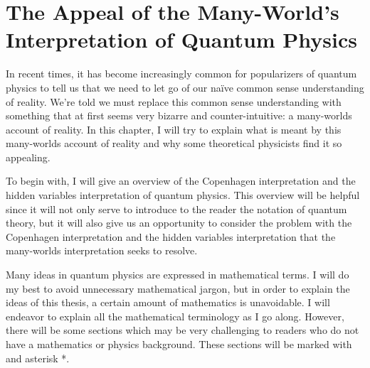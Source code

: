 \begin{comment}
    \section{Introduction}
    \emph{}
    
    Common sense is very often underrated. This is especially so in the light of modern physics. Not infrequently, one hears people claim that modern physics shows us that reality is fundamentally weird and that we must discard our naïve common sense intuitions. Now perhaps these people are right, but if we are to accept their claims, they ought to have really compelling reasons. The usual response to an argument that results in weird or seemingly absurd conclusions is to question the argument's premises or examine whether the argument is logically valid. 
\end{comment}
    \chapter{The Appeal of the Many-World's Interpretation of Quantum Physics}
    In recent times, it has become increasingly common for popularizers of quantum physics to tell us that we need to let go of our naïve common sense understanding of reality. We're told we must replace this common sense understanding with something that at first seems very bizarre and counter-intuitive: a many-worlds account of reality. In this chapter, I will try to explain what is meant by this many-worlds account of reality and why some theoretical physicists find it so appealing.
    
    To begin with, I will give an overview of the Copenhagen interpretation and the hidden variables interpretation of quantum physics. This overview will be helpful since it will not only serve to introduce to the reader the notation of quantum theory, but it will also give us an opportunity to consider the problem with the Copenhagen interpretation and the hidden variables interpretation that the many-worlds interpretation seeks to resolve. 

    Many ideas in quantum physics are expressed in mathematical terms. I will do my best to avoid unnecessary mathematical jargon, but in order to explain the ideas of this thesis, a certain amount of mathematics is unavoidable. I will endeavor to explain all the mathematical terminology as I go along. However, there will be some sections which may be very challenging to readers who do not have a mathematics or physics background. These sections will be marked with and asterisk *.\label{asteriskmeaning}